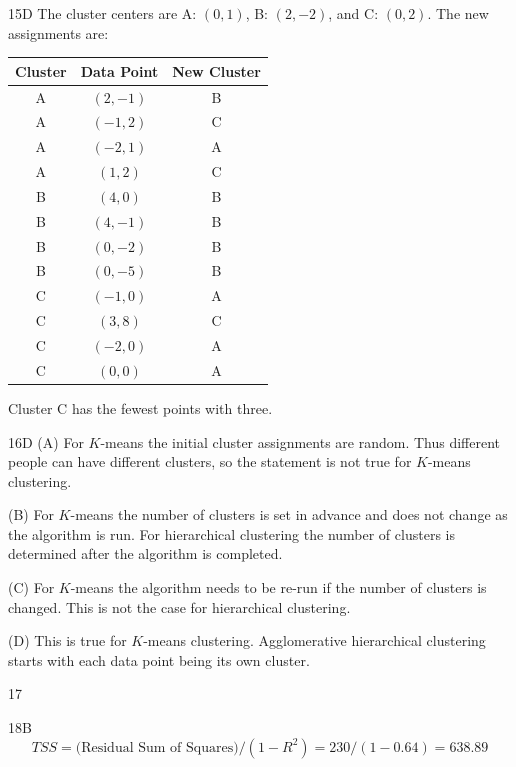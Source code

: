 \begin{solution}{15}{D}
The cluster centers are A: $(0, 1)$, B: $(2, -2)$, and C: $(0, 2)$. The new assignments are:
\begin{center}
\begin{tabular}{|c|c|c|}
\hline
Cluster & Data Point & New Cluster \\ \hline
A & $(2, -1)$ & B \\ \hline
A & $(-1, 2)$ & C \\ \hline
A & $(-2, 1)$ & A \\ \hline
A & $(1, 2)$ & C \\ \hline
B & $(4, 0)$ & B \\ \hline
B & $(4, -1)$ & B \\ \hline
B & $(0, -2)$ & B \\ \hline
B & $(0, -5)$ & B \\ \hline
C & $(-1, 0)$ & A \\ \hline
C & $(3, 8)$ & C \\ \hline
C & $(-2, 0)$ & A \\ \hline
C & $(0, 0)$ & A \\ \hline
\end{tabular}
\end{center}

Cluster C has the fewest points with three.
\end{solution}

\begin{solution}{16}{D}
(A) For $K$-means the initial cluster assignments are random. Thus different people can have different clusters, so the statement is not true for $K$-means clustering.

(B) For $K$-means the number of clusters is set in advance and does not change as the algorithm is run. For hierarchical clustering the number of clusters is determined after the algorithm is completed.

(C) For $K$-means the algorithm needs to be re-run if the number of clusters is changed. This is not the case for hierarchical clustering.

(D) This is true for $K$-means clustering. Agglomerative hierarchical clustering starts with each data point being its own cluster.
\end{solution}

\begin{solution}{17}{}
\deleted
\end{solution}

\begin{solution}{18}{B}
\[ TSS = \text{(Residual Sum of Squares)} / (1 - R^2) = 230 / (1 - 0.64) = 638.89 \]
\end{solution}

